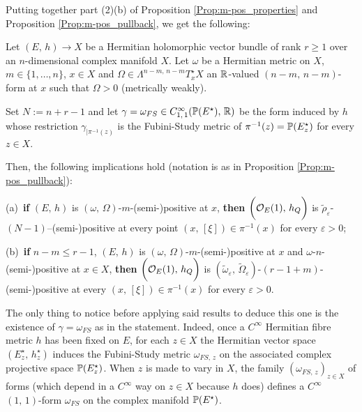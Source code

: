 \documentclass[12pt]{article}
\begin{document}
\vspace{1ex}

Putting together part (2)(b) of Proposition \ref{Prop:m-pos_properties} and Proposition \ref{Prop:m-pos_pullback}, we get the following:

\begin{Cor}\label{Cor:m-pos_O(1)} Let $(E,\,h)\longrightarrow X$ be a Hermitian holomorphic vector bundle of rank $r\geq 1$ over an $n$-dimensional complex manifold $X$. Let $\omega$ be a Hermitian metric on $X$, $m\in\{1,\dots , n\}$, $x\in X$ and $\Omega\in\Lambda^{n-m,\,n-m}T^\star_x X$ an $\mathbb{R}$-valued $(n-m,\,n-m)$-form at $x$ such that $\Omega> 0$ (metrically weakly).

  Set $N:=n+r-1$ and let $\gamma=\omega_{FS}\in C^\infty_{1,\,1}(\mathbb{P}(E^\star),\,\mathbb{R})$ be the form induced by $h$ whose restriction $\gamma_{|\pi^{-1}(z)}$ is the Fubini-Study metric of $\pi^{-1}(z)=\mathbb{P}(E^\star_z)$ for every $z\in X$.

\vspace{1ex}

  Then, the following implications hold (notation is as in Proposition \ref{Prop:m-pos_pullback}): 

\vspace{1ex}

(a)\, {\bf if} $(E,\,h)$ is  $(\omega,\,\Omega)$-$m$-(semi-)positive at $x$, {\bf then}  $\bigg({\cal O}_E(1),\,h_Q\bigg)$ is $\tilde\rho_\varepsilon$-$(N-1)$--(semi-)positive at every point $(x,\,[\xi])\in\pi^{-1}(x)$ for every $\varepsilon>0$;

\vspace{1ex}

(b)\, {\bf if} $n-m\leq r-1$, $(E,\,h)$ is  $(\omega,\,\Omega)$-$m$-(semi-)positive  at $x$ and $\omega$-$n$-(semi-)positive at $x\in X$, {\bf then} $\bigg({\cal O}_E(1),\,h_Q\bigg)$ is $(\widetilde\omega_\varepsilon,\,\widetilde\Omega_\varepsilon)$-$(r-1+m)$-(semi-)positive at every $(x,\,[\xi])\in\pi^{-1}(x)$ for every $\varepsilon>0$.


\end{Cor}


 The only thing to notice before applying said results to deduce this one is the existence of $\gamma=\omega_{FS}$ as in the statement. Indeed, once a $C^\infty$ Hermitian fibre metric $h$ has been fixed on $E$, for each $z\in X$ the Hermitian vector space $(E^\star_z,\,h_z^\star)$ induces the Fubini-Study metric $\omega_{FS,\,z}$ on the associated complex projective space $\mathbb{P}(E^\star_z)$. When $z$ is made to vary in $X$, the family $(\omega_{FS,\,z})_{z\in X}$ of forms (which depend in a $C^\infty$ way on $z\in X$ because $h$ does) defines a $C^\infty$ $(1,\,1)$-form $\omega_{FS}$ on the complex manifold $\mathbb{P}(E^\star)$.
\end{document}

